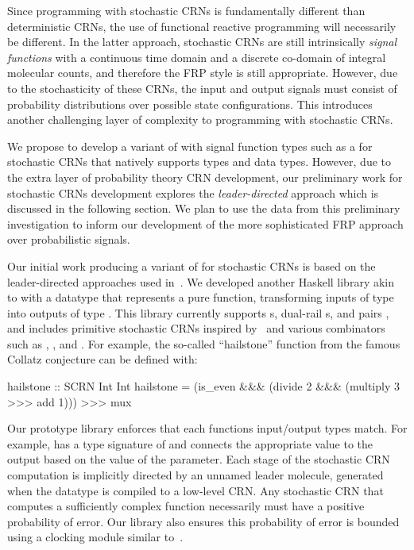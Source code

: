 Since programming with stochastic CRNs is fundamentally different than deterministic CRNs, the use of functional reactive programming will necessarily be different.
In the latter approach, stochastic CRNs are still intrinsically \emph{signal functions} with a continuous time domain and a discrete co-domain of integral molecular counts, and therefore the FRP style is still appropriate.
However, due to the stochasticity of these CRNs, the input and output signals must consist of probability distributions over possible state configurations.
This introduces another challenging layer of complexity to programming with stochastic CRNs.

We propose to develop a variant of \reactamole{} with signal function types such as a  for stochastic CRNs that natively supports types  and  data types.
However, due to the extra layer of probability theory CRN development, our preliminary work for stochastic CRNs development explores the \emph{leader-directed} approach which is discussed in the following section.
We plan to use the data from this preliminary investigation to inform our development of the more sophisticated FRP approach over probabilistic signals.

Our initial work producing a variant of \reactamole{} for stochastic CRNs is based on the leader-directed approaches used in~\cite{jAnAsEi08,jSCWB08,Doty2018}.
We developed another Haskell library akin to \reactamole{} with a datatype  that represents a pure function, transforming inputs of type  into outputs of type .
This library currently supports s, dual-rail s, and pairs , and includes primitive stochastic CRNs inspired by~\cite{cChDoSo12} and various combinators such as \hask{>>>}, \hask{&&&}, and \hask{***}.
For example, the so-called ``hailstone'' function from the famous Collatz conjecture can be defined with:
\begin{haskellcode}
hailstone :: SCRN Int Int
hailstone = (is_even &&& (divide 2 &&& (multiply 3 >>> add 1))) >>> mux
\end{haskellcode}
Our prototype library enforces that each functions input/output types match.
For example,  has a type signature of  and connects the appropriate value to the output based on the value of the  parameter.
Each stage of the stochastic CRN computation is implicitly directed by an unnamed leader molecule, generated when the  datatype is compiled to a low-level CRN.
Any stochastic CRN that computes a sufficiently complex function necessarily must have a positive probability of error.
Our library also ensures this probability of error is bounded using a clocking module similar to~\cite{jSCWB08}.

